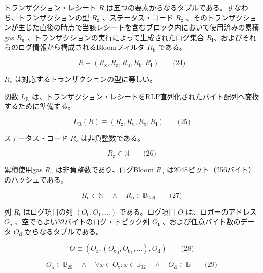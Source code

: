 \documentclass[
]{ltjsarticle}
\begin{document}
トランザクション・レシート \(R\)
は五つの要素からなるタプルである。すなわち、トランザクションの型
\(R_{\mathrm{x}}\) 、ステータス・コード \(R_{\mathrm{z}}\)
、そのトランザクションが生じた直後の時点で当該レシートを含むブロック内において使用済みの累積gas
\(R_{\mathrm{u}}\) 、トランザクションの実行によって生成されたログ集合
\protect\hyperlink{RLP_serialisation_of_a_sequence_of_other_items_R__l_math_def}{\(R_\mathbf{l}\)}、およびそれらのログ情報から構成されるBloomフィルタ
\protect\hyperlink{RLP_serialisation_of_a_byte_array_R__b_math_def}{\(R_{\mathrm{b}}\)}
である。

\protect\hypertarget{eq-24}{}{}

\[R \equiv (R_{\mathrm{x}}, R_{\mathrm{z}}, R_{\mathrm{u}}, R_{\mathrm{b}}, R_{\mathbf{l}}) \qquad \text{(24)}\]

\(R_{\mathrm{x}}\)
は対応するトランザクションの\protect\hyperlink{tx_type}{型}に等しい。

関数 \(L_{\mathrm{R}}\)
は、トランザクション・レシートをRLP直列化されたバイト配列へ変換するために準備する。

\protect\hypertarget{eq-25}{}{}

\[L_{\mathrm{R}}(R) \equiv (R_{\mathrm{z}}, R_{\mathrm{u}}, R_{\mathrm{b}}, R_{\mathbf{l}}) \qquad \text{(25)}\]

ステータス・コード \(R_{\mathrm{z}}\) は非負整数である。

\protect\hypertarget{eq-26}{}{}

\[R_{\mathrm{z}} \in \mathbb{N} \qquad \text{(26)}\]

累積使用gas \(R_{\mathrm{u}}\) は非負整数であり、ログBloom
\(R_{\mathrm{b}}\) は2048ビット（256バイト）のハッシュである。

\protect\hypertarget{eq-27}{}{}

\[R_{\mathrm{u}} \in \mathbb{N} \quad \wedge \quad R_{\mathrm{b}} \in \mathbb{B}_{256} \qquad \text{(27)}\]

列 \(R_{\mathbf{l}}\) はログ項目の列 \((O_0, O_1, ...)\)
である。ログ項目 \(O\) は、ロガーのアドレス \(O_a\)
、空でもよい32バイトのログ・トピック列 \(O_{\mathbf{t}}\)
、および任意バイト数のデータ \(O_{\mathbf{d}}\) からなるタプルである。

\protect\hypertarget{eq-28}{}{}

\[O \equiv (O_{\mathrm{a}}, ({O_{\mathbf{t}}}_0, {O_{\mathbf{t}}}_1, ...), O_{\mathbf{d}}) \qquad \text{(28)}\]

\protect\hypertarget{eq-29}{}{}

\[O_{\mathrm{a}} \in \mathbb{B}_{20} \quad \wedge \quad \forall x \in O_{\mathbf{t}}: x \in \mathbb{B}_{32} \quad \wedge \quad O_{\mathbf{d}} \in \mathbb{B} \qquad \text{(29)}\]
\end{document}
